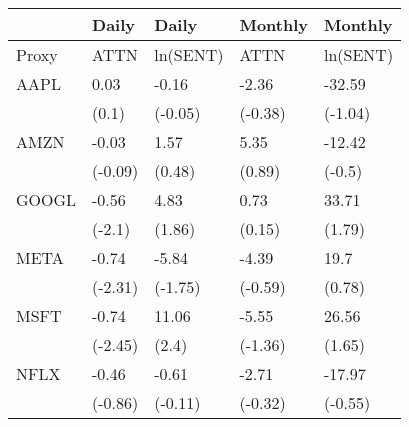 \begin{tabular}{lllll}
\toprule
{} &    Daily &     Daily &  Monthly &   Monthly \\
\midrule
Proxy &     ATTN &  ln(SENT) &     ATTN &  ln(SENT) \\
AAPL  &     0.03 &     -0.16 &    -2.36 &    -32.59 \\
      &    (0.1) &   (-0.05) &  (-0.38) &   (-1.04) \\
AMZN  &    -0.03 &      1.57 &     5.35 &    -12.42 \\
      &  (-0.09) &    (0.48) &   (0.89) &    (-0.5) \\
GOOGL &    -0.56 &      4.83 &     0.73 &     33.71 \\
      &   (-2.1) &    (1.86) &   (0.15) &    (1.79) \\
META  &    -0.74 &     -5.84 &    -4.39 &      19.7 \\
      &  (-2.31) &   (-1.75) &  (-0.59) &    (0.78) \\
MSFT  &    -0.74 &     11.06 &    -5.55 &     26.56 \\
      &  (-2.45) &     (2.4) &  (-1.36) &    (1.65) \\
NFLX  &    -0.46 &     -0.61 &    -2.71 &    -17.97 \\
      &  (-0.86) &   (-0.11) &  (-0.32) &   (-0.55) \\
\bottomrule
\end{tabular}
